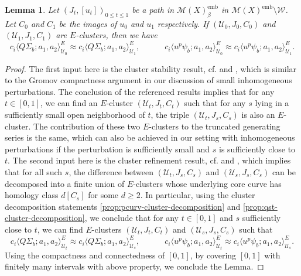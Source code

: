 \documentclass[reqno]{amsart}
\numberwithin{equation}{section}
\numberwithin{equation}{section}
\numberwithin{equation}{section}
\newtheorem{lemma}[thm]{Lemma}
\theoremstyle{definition}
\theoremstyle{remark}
\theoremstyle{remark}
\begin{document}
\begin{lemma}\label{lemma:tech-1}
    Let $(J_t, [u_t])_{0 \leq t \leq 1}$ be a path in $\mathcal{M}(X)^{\mathrm{emb}}_\beta$ in $\mathcal{M}(X)^{\mathrm{emb}} \setminus \mathcal{W}$. Let $C_0$ and $C_1$ be the images of $u_0$ and $u_1$ respectively. If $(\mathcal{U}_0, J_0, C_0)$ and $(\mathcal{U}_1, J_1, C_1)$ are $E$-clusters, then we have
    \begin{equation}
        c_i \langle Q\Sigma_b ; a_1, a_2 \rangle^E_{\mathcal{U}_0} \approx c_i \langle Q\Sigma_b ; a_1, a_2 \rangle^E_{\mathcal{U}_1}, \quad \quad \quad c_i \langle  u^p \psi_b; a_1, a_2 \rangle^E_{\mathcal{U}_0}  \approx c_i \langle  u^p \psi_b; a_1, a_2 \rangle^E_{\mathcal{U}_1}.
    \end{equation}
\end{lemma}
\begin{proof}
    The first input here is the cluster stability result, cf. \cite[Lemma 2.1]{IP-GV} and \cite[Proposition 3.20]{doan2021gopakumar}, which is similar to the Gromov compactness argument in our discussion of small inhomogeneous perturbations. The conclusion of the referenced results implies that for any $t \in [0,1]$, we can find an $E$-cluster $(\mathcal{U}_t, J_t, C_t)$ such that for any $s$ lying in a sufficiently small open neighborhood of $t$, the triple $(\mathcal{U}_t, J_s, C_s)$ is also an $E$-cluster. The contribution of these two $E$-clusters to the truncated generating series is the same, which can also be achieved in our setting with inhomogeneous perturbations if the perturbation is sufficiently small and $s$ is sufficiently close to $t$. The second input here is the cluster refinement result, cf. \cite[Corollary 2.5]{IP-GV} and \cite[Proposition 3.19]{doan2021gopakumar}, which implies that for all such $s$, the difference between $(\mathcal{U}_t, J_s, C_s)$ and $(\mathcal{U}_s, J_s, C_s)$ can be decomposed into a finite union of $E$-clusters whose underlying core curve has homology class $d[C_s]$ for some $d \geq 2$. In particular, using the cluster decomposition statements \cref{prop:pcurv-cluster-decomposition} and \cref{prop:qst-cluster-decomposition}, we conclude that for any $t \in [0,1]$ and $s$ sufficiently close to $t$, we can find $E$-clusters $(\mathcal{U}_t, J_t, C_t)$ and $(\mathcal{U}_s, J_s, C_s)$ such that
    \begin{equation}
        c_i \langle Q\Sigma_b ; a_1, a_2 \rangle^E_{\mathcal{U}_t} \approx c_i \langle Q\Sigma_b ; a_1, a_2 \rangle^E_{\mathcal{U}_s}, \quad \quad \quad c_i \langle  u^p  \psi_b; a_1, a_2 \rangle^E_{\mathcal{U}_t}  \approx c_i \langle u^p  \psi_b; a_1, a_2 \rangle^E_{\mathcal{U}_s}.
    \end{equation}
    Using the compactness and connectedness of $[0,1]$, by covering $[0,1]$ with finitely many intervals with above property, we conclude the Lemma.
\end{proof}
\end{document}
